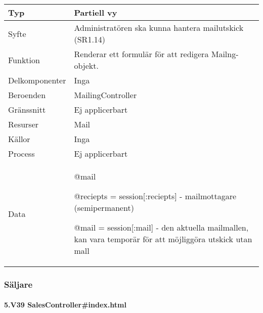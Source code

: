 \documentclass[a4paper, twoside, 11pt, titlepage]{article}
\begin{document}
			\begin {table} [ht] \begin{tabular} {  p{3.5cm} p{9.6cm} }
				\hline
				{Typ} & {Partiell vy} \\
				\hline
				{Syfte} & {Administratören ska kunna hantera mailutskick (SR1.14)} \\
				\hline
				{Funktion} & {Renderar ett formulär för att redigera Mailng-objekt.} \\
				\hline
				{Delkomponenter} & {Inga} \\
				\hline
				{Beroenden} & {MailingController} \\
				\hline
				{Gränssnitt} & {Ej applicerbart} \\
				\hline
				{Resurser} & {Mail} \\
				\hline
				{Källor} & {Inga} \\
				\hline
				{Process} & {Ej applicerbart} \\
				\hline
				{Data} & {@mail

@reciepts = session[:reciepts] - mailmottagare (semipermanent)

@mail = session[:mail] - den aktuella mailmallen, kan vara temporär för att möjliggöra utskick utan mall} \\
				\hline
			\end{tabular} \end{table} \FloatBarrier


		\subsubsection{Säljare}



			\paragraph{5.V39 SalesController\#index.html}\
\end{document}
